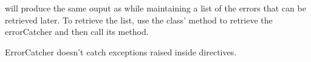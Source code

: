 will produce the same ouput as
 while maintaining a list of the errors that can be retrieved later.
To retrieve the list, use the  class'  method
to retrieve the errorCatcher and then call its  method.

ErrorCatcher doesn't catch exceptions raised inside directives. 





